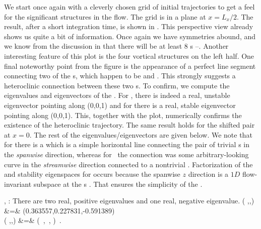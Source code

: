 We start once again with a cleverly chosen grid of initial trajectories 
to get a feel for the significant structures in the flow. The grid is in 
a plane at $x = L_{x}/2$. The result, after a short integration time, is 
shown in . This perspective view already shows 
us quite a bit of information. Once again we have symmetries abound, and 
we know from the discussion in  that there will be 
at least 8 {\stagp}s --.  Another interesting feature of this 
plot is the four vortical structures on the left half. One final 
noteworthy point from the figure is the appearance of a perfect line 
segment connecting two of the {\stagp}s, which happen to be  and 
. This strongly suggests a heteroclinic connection between these 
two \stagp s. To confirm, we compute the eigenvalues and eigenvectors of 
the \velgradmat. For , there is indeed a real, unstable eigenvector 
pointing along (0,0,1) and for  there is a real, stable eigenvector 
pointing along (0,0,1). This, together with the plot, numerically 
confirms the existence of the heteroclinic trajectory. The same result  
holds for the shifted pair at $x = 0$. The rest of the 
eigenvalues/eigenvectors are given below. We note that for {\tEQeight} there 
is a {\hc} which is a simple horizontal line connecting the pair of 
trivial \stagp s in the \emph{spanwise} direction, whereas for \tEQtwo\ 
the connection was some arbitrary-looking curve in the 
\emph{streamwise} direction connected to a nontrivial \stagp. 
Factorization of the  and  stability eigenspaces for {\tEQeight} 
occurs because the spanwise $z$ direction is a $1D$ flow-invariant 
subspace at the \stagp s \citep{SiCvi10}. That ensures the simplicity of 
the \hec. 

{\tEQeight}, : There are two real, positive eigenvalues
 and one real, negative eigenvalue.
\bea
\left(
    \eigExp[1],\eigExp[2],\eigExp[3]
\right) &=&
      (0.363557,0.227831,-0.591389)
\label{E8SP1} \\
\left(
    \jEigvec[1],\jEigvec[2],\jEigvec[3]
\right) &=&
\left(
    \left[\begin{array}{c}
             {0} \cr
             {0} \cr
             {1}
 \end{array}\right] \,,
    \left[\begin{array}{c}
             {-0.733415} \cr
             {-0.679780} \cr
             {0}
 \end{array}\right] \,,
    \left[\begin{array}{c}
             {0.991005} \cr
             {0.133824} \cr
             {0}
 \end{array}\right]
\right) \,.
\nnu
\eea

